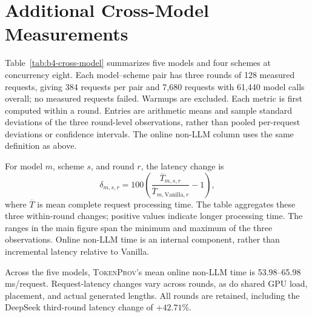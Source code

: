 \section{Additional Cross-Model Measurements}
\label{app:b4-cross-model}
Table~\ref{tab:b4-cross-model} summarizes five models and four schemes at
concurrency eight. Each model--scheme pair has three rounds of 128 measured
requests, giving 384 requests per pair and 7,680 requests with 61,440 model calls
overall; no measured requests failed. Warmups are excluded.
Each metric is first computed within a round. Entries are arithmetic means and
sample standard deviations of the three round-level observations, rather than
pooled per-request deviations or confidence intervals.
The online non-LLM column uses the same definition as above.

For model $m$, scheme $s$, and round $r$, the latency change is
\[
\delta_{m,s,r}=100\left(
\frac{\overline{T}_{m,s,r}}{\overline{T}_{m,\mathrm{Vanilla},r}}-1\right),
\]
where $\overline{T}$ is mean complete request processing time.
The table aggregates these three within-round changes; positive values indicate
longer processing time. The ranges in the main figure span the minimum and maximum
of the three observations. Online non-LLM time is an internal component, rather
than incremental latency relative to Vanilla.

Across the five models, \textsc{TokenProv}'s mean online non-LLM time is
53.98--65.98\,ms/request. Request-latency changes vary across rounds, as do shared
GPU load, placement, and actual generated lengths. All rounds are retained,
including the DeepSeek third-round latency change of $+42.71\%$.

